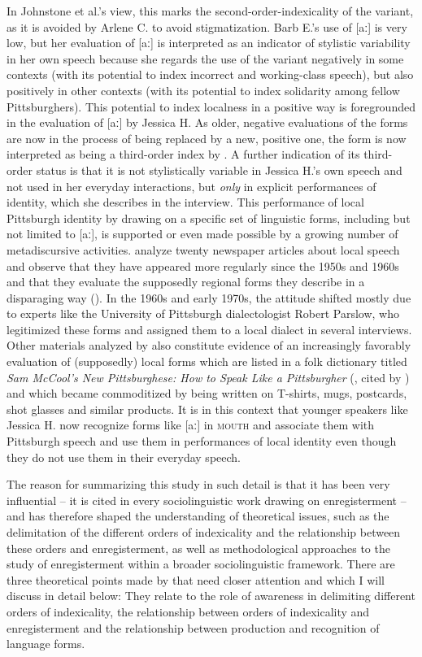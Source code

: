 In Johnstone et al.’s view, this marks the second-order-indexicality of the variant, as it is avoided by Arlene C. to avoid stigmatization. Barb E.’s use of [aː] is very low, but her evaluation of [aː] is interpreted as an indicator of stylistic variability in her own speech because she regards the use of the variant negatively in some contexts (with its potential to index incorrect and working-class speech), but also positively in other contexts (with its potential to index solidarity among fellow Pittsburghers). This potential to index localness in a positive way is foregrounded in the evaluation of [aː] by Jessica H. As older, negative evaluations of the forms are now in the process of being replaced by a new, positive one, the form is now interpreted as being a third-order index by \citet{Johnstone2006}. A further indication of its third-order status is that it is not stylistically variable in Jessica H.’s own speech and not used in her everyday interactions, but \textit{only} in explicit performances of identity, which she describes in the interview. This performance of local Pittsburgh identity by drawing on a specific set of linguistic forms, including but not limited to [aː], is supported or even made possible by a growing number of metadiscursive activities. \citet{Johnstone2006} analyze twenty newspaper articles about local speech and observe that they have appeared more regularly since the 1950s and 1960s and that they evaluate the supposedly regional forms they describe in a disparaging way (\citeyear[95]{Johnstone2006}). In the 1960s and early 1970s, the attitude shifted mostly due to experts like the University of Pittsburgh dialectologist Robert Parslow, who legitimized these forms and assigned them to a local dialect in several interviews. Other materials analyzed by \citet{Johnstone2006} also constitute evidence of an increasingly favorably evaluation of (supposedly) local forms which are listed in a folk dictionary titled \emph{Sam McCool’s New Pittsburghese: How to Speak Like a Pittsburgher} (\citeyear{McCool1982}, cited by \citealt[96]{Johnstone2006}) and which became commoditized by being written on T-shirts, mugs, postcards, shot glasses and similar products. It is in this context that younger speakers like Jessica H. now recognize forms like [aː] in \textsc{mouth} and associate them with Pittsburgh speech and use them in performances of local identity even though they do not use them in their everyday speech.


The reason for summarizing this study in such detail is that it has been very influential – it is cited in every sociolinguistic work drawing on enregisterment – and has therefore shaped the understanding of theoretical issues, such as the delimitation of the different orders of indexicality and the relationship between these orders and enregisterment, as well as methodological approaches to the study of enregisterment within a broader sociolinguistic framework. There are three theoretical points made by \citet{Johnstone2006} that need closer attention and which I will discuss in detail below: They relate to the role of awareness in delimiting different orders of indexicality, the relationship between orders of indexicality and enregisterment and the relationship between production and recognition of language forms.

